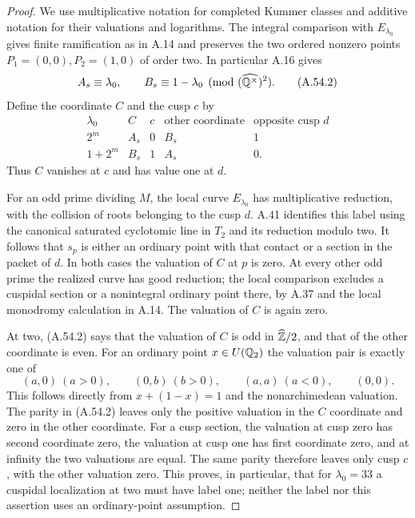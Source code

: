 \begin{proof}
We use multiplicative notation for completed Kummer classes and
additive notation for their valuations and logarithms.  The
integral comparison with $E_{\lambda_0}$ gives finite ramification
as in A.14 and preserves the two ordered nonzero points
$P_1=(0,0),P_2=(1,0)$ of order two.  In particular A.16 gives
\[
        A_s\equiv\lambda_0,\qquad
        B_s\equiv1-\lambda_0
                 \pmod{(\widehat{\mathbb Q^\times})^2}.
\tag{A.54.2}
\]
Define the coordinate $C$ and the cusp $c$ by
\[
\begin{array}{c|c|c|c|c}
\lambda_0&C&c&\text{other coordinate}&\text{opposite cusp }d\\ \hline
2^m&A_s&0&B_s&1\\
1+2^m&B_s&1&A_s&0.
\end{array}
\tag{A.54.3}
\]
Thus $C$ vanishes at $c$ and has value one at $d$.

For an odd prime dividing $M$, the local curve
$E_{\lambda_0}$ has multiplicative reduction, with the collision
of roots belonging to the cusp $d$.  A.41 identifies this label
using the canonical saturated cyclotomic line in $T_2$ and its
reduction modulo two.  It follows that $s_p$ is either an ordinary
point with that contact or a section in the packet of $d$.
In both cases the valuation of $C$ at $p$ is zero.  At every
other odd prime the realized curve has good reduction; the
local comparison excludes a cuspidal section or a nonintegral
ordinary point there, by A.37 and the local monodromy calculation
in A.14.  The valuation of $C$ is again zero.

At two, (A.54.2) says that the valuation of $C$ is odd in
$\widehat{\mathbb Z}/2$, and that of the other coordinate is even.
For an ordinary point $x\in U(\mathbb Q_2)$ the valuation pair is
exactly one of
\[
      (a,0)\ (a>0),\qquad (0,b)\ (b>0),\qquad
      (a,a)\ (a<0),\qquad (0,0).
\tag{A.54.4}
\]
This follows directly from $x+(1-x)=1$ and the nonarchimedean
valuation.  The parity in (A.54.2) leaves only the positive
valuation in the $C$ coordinate and zero in the other coordinate.
For a cusp section, the valuation at cusp zero has second
coordinate zero, the valuation at cusp one has first coordinate
zero, and at infinity the two valuations are equal.  The same
parity therefore leaves only cusp $c$, with the other valuation
zero.  This proves, in particular, that for $\lambda_0=33$ a
cuspidal localization at two must have label one; neither the
label nor this assertion uses an ordinary-point assumption.


\end{proof}
